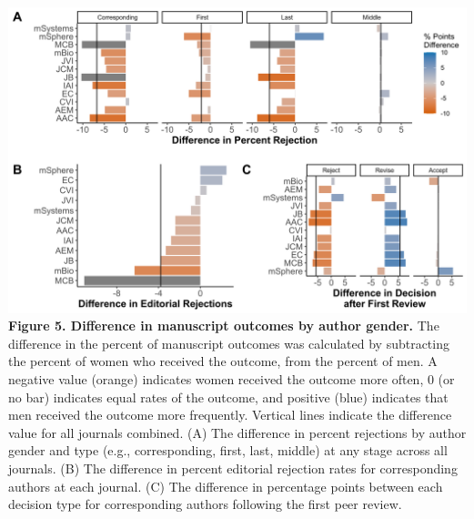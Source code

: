\documentclass[11pt,]{article}
\begin{document}
\includegraphics{Figure_5.png} \textbf{Figure 5. Difference in
manuscript outcomes by author gender.} The difference in the percent of
manuscript outcomes was calculated by subtracting the percent of women
who received the outcome, from the percent of men. A negative value
(orange) indicates women received the outcome more often, 0 (or no bar)
indicates equal rates of the outcome, and positive (blue) indicates that
men received the outcome more frequently. Vertical lines indicate the
difference value for all journals combined. (A) The difference in
percent rejections by author gender and type (e.g., corresponding,
first, last, middle) at any stage across all journals. (B) The
difference in percent editorial rejection rates for corresponding
authors at each journal. (C) The difference in percentage points between
each decision type for corresponding authors following the first peer
review.

\newpage
\end{document}
